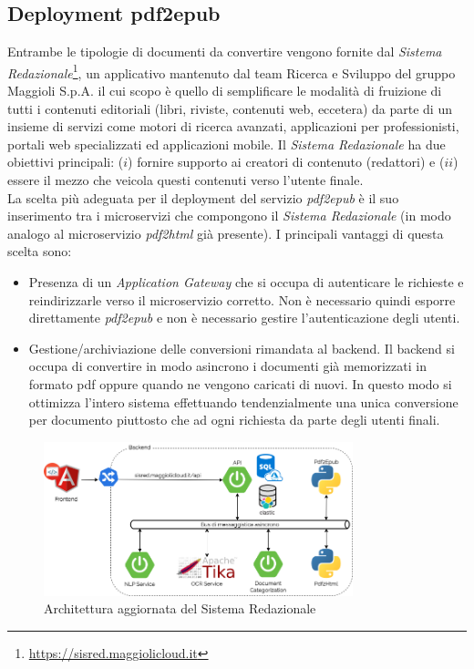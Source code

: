 \subsection{Deployment pdf2epub}
Entrambe le tipologie di documenti da convertire vengono fornite dal \textit{Sistema Redazionale}\footnote{\url{https://sisred.maggiolicloud.it}}, un applicativo mantenuto dal team Ricerca e Sviluppo del gruppo Maggioli S.p.A. il cui scopo è quello di semplificare le modalità di fruizione di tutti i contenuti editoriali (libri, riviste, contenuti web, eccetera) da parte di un insieme di servizi come motori di ricerca avanzati, applicazioni per professionisti, portali web specializzati ed applicazioni mobile. Il \textit{Sistema Redazionale} ha due obiettivi principali: ($i$) fornire supporto ai creatori di contenuto (redattori) e ($ii$) essere il mezzo che veicola questi contenuti verso l’utente finale\cite{amslaurea23043}.\\
La scelta più adeguata per il deployment del servizio \textit{pdf2epub} è il suo inserimento tra i microservizi che compongono il \textit{Sistema Redazionale} (in modo analogo al microservizio \textit{pdf2html} già presente). I principali vantaggi di questa scelta sono:
\begin{itemize}
    \item Presenza di un \textit{Application Gateway} che si occupa di autenticare le richieste e reindirizzarle verso il microservizio corretto. Non è necessario quindi esporre direttamente \textit{pdf2epub} e non è necessario gestire l'autenticazione degli utenti.
    \item Gestione/archiviazione delle conversioni rimandata al backend. Il backend si occupa di convertire in modo asincrono i documenti già memorizzati in formato pdf oppure quando ne vengono caricati di nuovi. In questo modo si ottimizza l'intero sistema effettuando tendenzialmente una unica conversione per documento piuttosto che ad ogni richiesta da parte degli utenti finali.
\end{itemize}
\begin{figure}[H]
\centering
\includegraphics[width=0.8\textwidth]{img/tesi-7-sisred.drawio.png}
\caption{Architettura aggiornata del Sistema Redazionale}
\end{figure}
